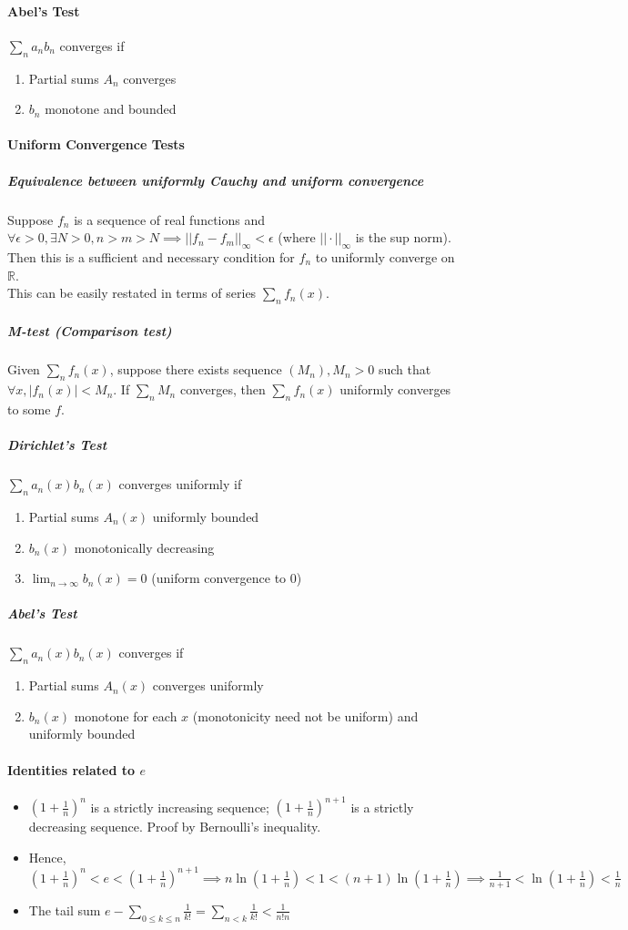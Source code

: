 \documentclass{article}
\begin{document}
	\paragraph{Abel's Test} $\sum_n a_nb_n$ converges if
	\begin{enumerate}
		\item Partial sums $A_n$ converges
		\item $b_n$ monotone and bounded
	\end{enumerate}
	\paragraph*{Uniform Convergence Tests}
	\subparagraph{Equivalence between uniformly Cauchy and uniform convergence} Suppose $f_n$ is a sequence of real functions and $\forall \epsilon>0, \exists N>0, n>m>N\implies ||f_n-f_m||_{\infty}<\epsilon$ (where $||\cdot||_{\infty}$ is the sup norm). Then this is a sufficient and necessary condition for $f_n$ to uniformly converge on $\mathbb{R}$.\\
	This can be easily restated in terms of series $\sum_n f_n(x)$.
	\subparagraph{M-test (Comparison test)} Given $\sum_n f_n(x)$, suppose there exists sequence $(M_n), M_n>0$ such that $\forall x, |f_n(x)|<M_n$. If $\sum_n M_n$ converges, then $\sum_n f_n(x)$ uniformly converges to some $f$.
	\subparagraph{Dirichlet's Test} $\sum_n a_n(x)b_n(x)$ converges uniformly if
	\begin{enumerate}
		\item Partial sums $A_n(x)$ uniformly bounded
		\item $b_n(x)$ monotonically decreasing
		\item $\lim_{n\rightarrow \infty}b_n(x) = 0$ (uniform convergence to 0)
	\end{enumerate}
	\subparagraph{Abel's Test} $\sum_n a_n(x)b_n(x)$ converges if
	\begin{enumerate}
		\item Partial sums $A_n(x)$ converges uniformly
		\item $b_n(x)$ monotone for each $x$ (monotonicity need not be uniform) and uniformly bounded
	\end{enumerate}
	\paragraph{Identities related to $e$}
\begin{itemize}
	\item $(1+\frac{1}{n})^n$ is a strictly increasing sequence; $(1+\frac{1}{n})^{n+1}$ is a strictly decreasing sequence. Proof by Bernoulli's inequality.
	\item Hence, $(1+\frac{1}{n})^n < e < (1+\frac{1}{n})^{n+1}\implies n\ln(1+\frac{1}{n}) < 1 < (n+1)\ln(1+\frac{1}{n})\implies \frac{1}{n+1}<\ln(1+\frac{1}{n})<\frac{1}{n}$
	\item The tail sum $e-\sum_{0\leq k\leq n}\frac{1}{k!}=\sum_{n<k}\frac{1}{k!}<\frac{1}{n!n}$
\end{itemize}
\end{document}
